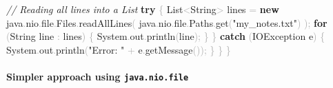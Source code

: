 \documentclass[
  justified,
  openright,
]{tufte-book}
\let\subsection\paragraph
\let\paragraph\paragraph
\newcommand{\KeywordTok}[1]{\textcolor{CodeKeyword}{\textbf{#1}}}  %
\newcommand{\StringTok}[1]{\textcolor{CodeString}{#1}}              %
\newcommand{\CommentTok}[1]{\textcolor{CodeComment}{\textit{#1}}}  %
\newcommand{\CodeFuncTok}[1]{\textcolor{CodeKeyword}{#1}}           %
\newcommand{\OperatorTok}[1]{\textcolor{DarkGray}{#1}}              %
\newenvironment{Shaded}{%
  \begin{mdframed}[style=TufteCode]%
}{%
  \end{mdframed}%
}
\let\subsection\paragraph
\let\paragraph\paragraph
\begin{document}
\begin{Shaded}
\begin{Highlighting}[]
        \CommentTok{// Reading all lines into a List}
        \KeywordTok{try} \OperatorTok{\{}
            List\OperatorTok{\textless{}}String\OperatorTok{\textgreater{}} lines \OperatorTok{=} \KeywordTok{new} java\OperatorTok{.}\CodeFuncTok{nio}\OperatorTok{.}\CodeFuncTok{file}\OperatorTok{.}\CodeFuncTok{Files}\OperatorTok{.}\CodeFuncTok{readAllLines}\OperatorTok{(}
                java\OperatorTok{.}\CodeFuncTok{nio}\OperatorTok{.}\CodeFuncTok{file}\OperatorTok{.}\CodeFuncTok{Paths}\OperatorTok{.}\CodeFuncTok{get}\OperatorTok{(}\StringTok{"my\_notes.txt"}\OperatorTok{)}
            \OperatorTok{);}
            \KeywordTok{for} \OperatorTok{(}String line \OperatorTok{:} lines\OperatorTok{)} \OperatorTok{\{}
                System\OperatorTok{.}\CodeFuncTok{out}\OperatorTok{.}\CodeFuncTok{println}\OperatorTok{(}line\OperatorTok{);}
            \OperatorTok{\}}
        \OperatorTok{\}} \KeywordTok{catch} \OperatorTok{(}IOException e\OperatorTok{)} \OperatorTok{\{}
            System\OperatorTok{.}\CodeFuncTok{out}\OperatorTok{.}\CodeFuncTok{println}\OperatorTok{(}\StringTok{"Error: "} \OperatorTok{+} e\OperatorTok{.}\CodeFuncTok{getMessage}\OperatorTok{());}
        \OperatorTok{\}}
    \OperatorTok{\}}
\OperatorTok{\}}
\end{Highlighting}
\end{Shaded}

\subsection{\texorpdfstring{Simpler approach using
\texttt{java.nio.file}}{Simpler approach using java.nio.file}}\label{simpler-approach-using-java.nio.file}
\end{document}

